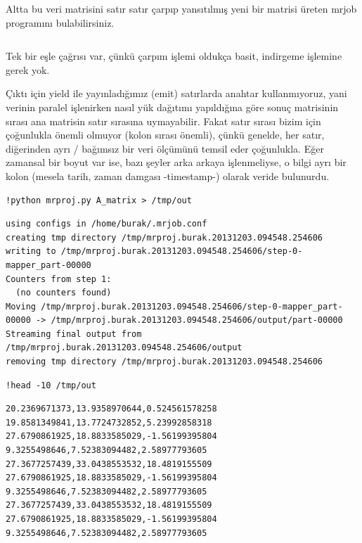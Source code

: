 \documentclass[12pt,fleqn]{article}\usepackage{../../common}
\begin{document}
Altta bu veri matrisini satır satır çarpıp yansıtılmış yeni bir
matrisi üreten mrjob programını bulabilirsiniz.

\inputminted[fontsize=\footnotesize]{python}{mrproj.py}

Tek bir eşle çağrısı var, çünkü çarpım işlemi oldukça basit, indirgeme
işlemine gerek yok.

Çıktı için yield ile yayınladığımız (emit) satırlarda anahtar
kullanmıyoruz, yani verinin paralel işlenirken nasıl yük dağıtımı
yapıldığına göre sonuç matrisinin sırası ana matrisin satır sırasına
uymayabilir. Fakat satır sırası bizim için çoğunlukla önemli olmuyor
(kolon sırası önemli), çünkü genelde, her satır, diğerinden ayrı /
bağımsız bir veri ölçümünü temsil eder çoğunlukla. Eğer zamansal bir
boyut var ise, bazı şeyler arka arkaya işlenmeliyse, o bilgi ayrı bir
kolon (mesela tarih, zaman damgası -timestamp-) olarak veride
bulunurdu.

\begin{verbatim}
!python mrproj.py A_matrix > /tmp/out
\end{verbatim}

\begin{verbatim}
using configs in /home/burak/.mrjob.conf
creating tmp directory /tmp/mrproj.burak.20131203.094548.254606
writing to /tmp/mrproj.burak.20131203.094548.254606/step-0-mapper_part-00000
Counters from step 1:
  (no counters found)
Moving /tmp/mrproj.burak.20131203.094548.254606/step-0-mapper_part-00000 -> /tmp/mrproj.burak.20131203.094548.254606/output/part-00000
Streaming final output from /tmp/mrproj.burak.20131203.094548.254606/output
removing tmp directory /tmp/mrproj.burak.20131203.094548.254606
\end{verbatim}

\begin{verbatim}
!head -10 /tmp/out
\end{verbatim}

\begin{verbatim}
20.2369671373,13.9358970644,0.524561578258
19.8581349841,13.7724732852,5.23992858318
27.6790861925,18.8833585029,-1.56199395804
9.3255498646,7.52383094482,2.58977793605
27.3677257439,33.0438553532,18.4819155509
27.6790861925,18.8833585029,-1.56199395804
9.3255498646,7.52383094482,2.58977793605
27.3677257439,33.0438553532,18.4819155509
27.6790861925,18.8833585029,-1.56199395804
9.3255498646,7.52383094482,2.58977793605
\end{verbatim}
\end{document}
